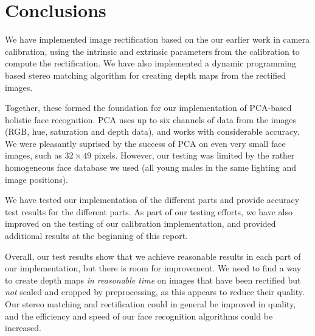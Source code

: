 
\section{Conclusions}
\label{sec:conclusions}
We have implemented image rectification based on the our earlier work
in camera calibration, using the intrinsic and extrinsic parameters from the
calibration to compute the rectification. We have also implemented a
dynamic programming based stereo matching algorithm for creating depth maps from
the rectified images.

Together, these formed the foundation for our implementation of PCA-based
holistic face recognition. PCA uses up to six channels of data from the images
(RGB, hue, saturation and depth data), and works with considerable accuracy. We
were pleasantly suprised by the success of PCA on even very small face images,
such as $32\times49$ pixels. However, our testing was limited by the rather
homogeneous face database we used (all young males in the same lighting and
image positions).

We have tested our implementation of the different parts and provide accuracy
test results for the different parts. As part of our testing efforts, we have
also improved on the testing of our calibration implementation, and provided
additional results at the beginning of this report.

Overall, our test results show that we achieve reasonable results in each part
of our implementation, but there is room for improvement. We need to find a way
to create depth maps \emph{in reasonable time} on images that have been
rectified but \emph{not} scaled and cropped by preprocessing, as this appears to
reduce their quality. Our stereo matching and rectification could in general be
improved in quality, and the efficiency and speed of our face recognition
algorithms could be increased.

